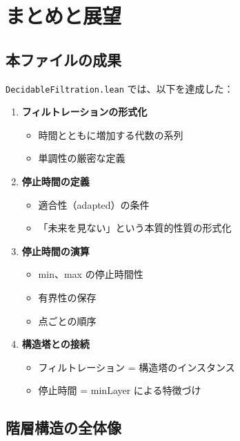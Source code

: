 \documentclass[12pt,a4paper,ja=standard]{bxjsarticle}
\theoremstyle{definition}
\begin{document}
\section{まとめと展望}\label{sec:conclusion}

\subsection{本ファイルの成果}

\texttt{DecidableFiltration.lean} では、以下を達成した：

\begin{enumerate}
    \item \textbf{フィルトレーションの形式化}
    \begin{itemize}
        \item 時間とともに増加する代数の系列
        \item 単調性の厳密な定義
    \end{itemize}
    
    \item \textbf{停止時間の定義}
    \begin{itemize}
        \item 適合性（adapted）の条件
        \item 「未来を見ない」という本質的性質の形式化
    \end{itemize}
    
    \item \textbf{停止時間の演算}
    \begin{itemize}
        \item min、max の停止時間性
        \item 有界性の保存
        \item 点ごとの順序
    \end{itemize}
    
    \item \textbf{構造塔との接続}
    \begin{itemize}
        \item フィルトレーション = 構造塔のインスタンス
        \item 停止時間 = minLayer による特徴づけ
    \end{itemize}
\end{enumerate}

\subsection{階層構造の全体像}
\end{document}
